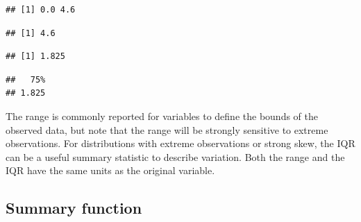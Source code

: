 \documentclass[
]{book}
\newenvironment{Shaded}{\begin{snugshade}}{\end{snugshade}}
\newcommand{\AttributeTok}[1]{\textcolor[rgb]{0.13,0.29,0.53}{#1}}
\newcommand{\DocumentationTok}[1]{\textcolor[rgb]{0.56,0.35,0.01}{\textbf{\textit{#1}}}}
\newcommand{\FloatTok}[1]{\textcolor[rgb]{0.00,0.00,0.81}{#1}}
\newcommand{\FunctionTok}[1]{\textcolor[rgb]{0.13,0.29,0.53}{\textbf{#1}}}
\newcommand{\NormalTok}[1]{#1}
\newcommand{\SpecialCharTok}[1]{\textcolor[rgb]{0.81,0.36,0.00}{\textbf{#1}}}
\begin{document}
\begin{verbatim}
## [1] 0.0 4.6
\end{verbatim}

\begin{Shaded}
\end{Shaded}

\begin{verbatim}
## [1] 4.6
\end{verbatim}

\begin{Shaded}
\end{Shaded}

\begin{verbatim}
## [1] 1.825
\end{verbatim}

\begin{Shaded}
\end{Shaded}

\begin{verbatim}
##   75% 
## 1.825
\end{verbatim}

The range is commonly reported for variables to define the bounds of the observed data, but note that the range will be strongly sensitive to extreme observations. For distributions with extreme observations or strong skew, the IQR can be a useful summary statistic to describe variation. Both the range and the IQR have the same units as the original variable.

\subsection{Summary function}\label{summary-function}
\end{document}
